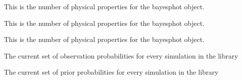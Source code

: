 \documentclass[letterpaper,10pt,english]{sphinxmanual}
\begin{document}
\begin{fulllineitems}
\begin{fulllineitems}
\begin{description}
\begin{description}
\end{description}

\end{description}

\end{fulllineitems}


\begin{fulllineitems}
\label{bayesphot:slugpy.bayesphot.bp.bp.ndim}
This is the number of physical properties for the bayesphot
object.

\end{fulllineitems}


\begin{fulllineitems}
\label{bayesphot:slugpy.bayesphot.bp.bp.nphot}
This is the number of physical properties for the bayesphot
object.

\end{fulllineitems}


\begin{fulllineitems}
\label{bayesphot:slugpy.bayesphot.bp.bp.nphys}
This is the number of physical properties for the bayesphot
object.

\end{fulllineitems}


\begin{fulllineitems}
\label{bayesphot:slugpy.bayesphot.bp.bp.pobs}
The current set of observation probabilities for every
simulation in the library

\end{fulllineitems}


\begin{fulllineitems}
\label{bayesphot:slugpy.bayesphot.bp.bp.priors}
The current set of prior probabilities for every
simulation in the library

\end{fulllineitems}



\end{fulllineitems}
\end{document}
